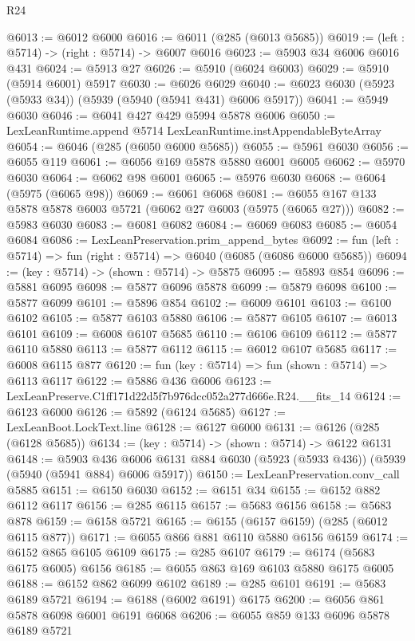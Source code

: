 \begin{lexlean}{R24}
\begin{coremodule}
@6013 := @6012 @6000
@6016 := @6011 (@285 (@6013 @5685))
@6019 := (left : @5714) -> (right : @5714) -> @6007 @6016
@6023 := @5903 @34 @6006 @6016 @431
@6024 := @5913 @27
@6026 := @5910 (@6024 @6003)
@6029 := @5910 (@5914 @6001) @5917
@6030 := @6026 @6029
@6040 := @6023 @6030 (@5923 (@5933 @34)) (@5939 (@5940 (@5941 @431) @6006 @5917))
@6041 := @5949 @6030
@6046 := @6041 @427 @429 @5994 @5878 @6006
@6050 := LexLeanRuntime.append @5714 LexLeanRuntime.instAppendableByteArray
@6054 := @6046 (@285 (@6050 @6000 @5685))
@6055 := @5961 @6030
@6056 := @6055 @119
@6061 := @6056 @169 @5878 @5880 @6001 @6005
@6062 := @5970 @6030
@6064 := @6062 @98 @6001
@6065 := @5976 @6030
@6068 := @6064 (@5975 (@6065 @98))
@6069 := @6061 @6068
@6081 := @6055 @167 @133 @5878 @5878 @6003 @5721 (@6062 @27 @6003 (@5975 (@6065 @27)))
@6082 := @5983 @6030
@6083 := @6081 @6082
@6084 := @6069 @6083
@6085 := @6054 @6084
@6086 := LexLeanPreservation.prim_append_bytes
@6092 := fun (left : @5714) => fun (right : @5714) => @6040 (@6085 (@6086 @6000 @5685))
@6094 := (key : @5714) -> (shown : @5714) -> @5875
@6095 := @5893 @854
@6096 := @5881 @6095
@6098 := @5877 @6096 @5878
@6099 := @5879 @6098
@6100 := @5877 @6099
@6101 := @5896 @854
@6102 := @6009 @6101
@6103 := @6100 @6102
@6105 := @5877 @6103 @5880
@6106 := @5877 @6105
@6107 := @6013 @6101
@6109 := @6008 @6107 @5685
@6110 := @6106 @6109
@6112 := @5877 @6110 @5880
@6113 := @5877 @6112
@6115 := @6012 @6107 @5685
@6117 := @6008 @6115 @877
@6120 := fun (key : @5714) => fun (shown : @5714) => @6113 @6117
@6122 := @5886 @436 @6006
@6123 := LexLeanPreserve.C1ff171d22d5f7b976dcc052a277d666e.R24.__fits_14
@6124 := @6123 @6000
@6126 := @5892 (@6124 @5685)
@6127 := LexLeanBoot.LockText.line
@6128 := @6127 @6000
@6131 := @6126 (@285 (@6128 @5685))
@6134 := (key : @5714) -> (shown : @5714) -> @6122 @6131
@6148 := @5903
    @436
    @6006
    @6131
    @884
    @6030
    (@5923 (@5933 @436))
    (@5939 (@5940 (@5941 @884) @6006 @5917))
@6150 := LexLeanPreservation.conv_call @5885
@6151 := @6150 @6030
@6152 := @6151 @34
@6155 := @6152 @882 @6112 @6117
@6156 := @285 @6115
@6157 := @5683 @6156
@6158 := @5683 @878
@6159 := @6158 @5721
@6165 := @6155 (@6157 @6159) (@285 (@6012 @6115 @877))
@6171 := @6055 @866 @881 @6110 @5880 @6156 @6159
@6174 := @6152 @865 @6105 @6109
@6175 := @285 @6107
@6179 := @6174 (@5683 @6175 @6005) @6156
@6185 := @6055 @863 @169 @6103 @5880 @6175 @6005
@6188 := @6152 @862 @6099 @6102
@6189 := @285 @6101
@6191 := @5683 @6189 @5721
@6194 := @6188 (@6002 @6191) @6175
@6200 := @6056 @861 @5878 @6098 @6001 @6191 @6068
@6206 := @6055 @859 @133 @6096 @5878 @6189 @5721

\end{coremodule}
\end{lexlean}
